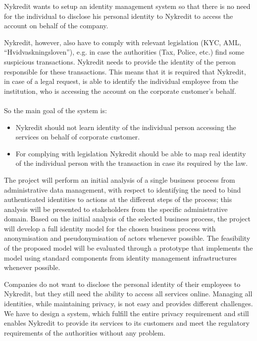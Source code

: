 Nykredit wants to setup an identity management system so that there is no need for the individual to disclose his personal identity to Nykredit to access the account on behalf of the company.

Nykredit, however, also have to comply with relevant legislation (KYC, AML, “Hvidvaskningsloven”),  e.g. in case the authorities (Tax, Police, etc.) find some suspicious transactions. Nykredit needs to provide the identity of the person responsible for these transactions.
This means that it is required that Nykredit, in case of a legal request, is able to identify the individual employee from the institution, who is accessing the account on the corporate customer’s behalf.
\\
\\So the main goal of the system is:
\begin{itemize}
	\item Nykredit should not learn identity of the individual person accessing the services on behalf of corporate customer.
	\item For complying with legislation Nykredit should be able to map real identity of the individual person with the transaction in case its required by the law.
\end{itemize}
The project will perform an initial analysis of a single business process from administrative data management, with respect to identifying the need to bind authenticated identities to actions at the different steps of the process; this analysis will be presented to stakeholders from the specific administrative domain. Based on the initial analysis of the selected business process, the project will develop a full identity model for the chosen business process with anonymisation and pseudonymisation of actors whenever possible. The feasibility of the proposed model will be evaluated through a prototype that implements the model using standard components from identity management infrastructures whenever possible.

Companies do not want to disclose the personal identity of their employees to Nykredit, but they still need the ability to access all services online. Managing all identities, while maintaining privacy, is not easy and provides different challenges. We have to design a system, which fulfill the entire privacy requirement and still enables Nykredit to provide its services to its customers and meet the regulatory requirements of the authorities without any problem.
 